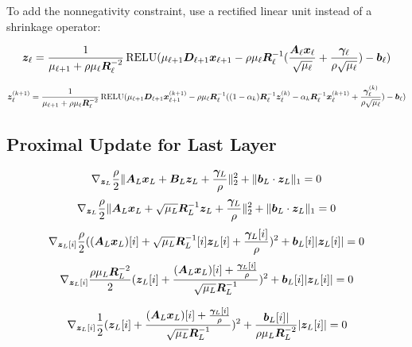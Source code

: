 To add the nonnegativity constraint, use a rectified linear unit instead of a shrinkage operator:

\begin{equation}
\bm{z}_{\ell} = \frac{1}{\mu_{\ell + 1} + \rho\mu_{\ell}\bm{R}_{\ell}^{-2}}\operatorname{RELU}(\mu_{\ell + 1}\bm{D}_{\ell + 1}\bm{x}_{\ell + 1} - \rho\mu_{\ell}\bm{R}_{\ell}^{-1}(\frac{\bm{A}_{\ell}\bm{x}_{\ell}}{\sqrt{\mu_{\ell}}} + \frac{\bm{\gamma}_{\ell}}{\rho\sqrt{\mu_{\ell}}}) - \bm{b}_{\ell})
\end{equation}

\begin{equation}
\bm{z}_{\ell}^{(k + 1)} = \frac{1}{\mu_{\ell + 1} + \rho\mu_{\ell}\bm{R}_{\ell}^{-2}}\operatorname{RELU}(\mu_{\ell + 1}\bm{D}_{\ell + 1}\bm{x}_{\ell + 1}^{(k + 1)} - \rho\mu_{\ell}\bm{R}_{\ell}^{-1}((1 - \alpha_k)\bm{R}_{\ell}^{-1}\bm{z}_{\ell}^{(k)} - \alpha_k\bm{R}_{\ell}^{-1}\bm{x}_{\ell}^{(k + 1)} + \frac{\bm{\gamma}_{\ell}^{(k)}}{\rho\sqrt{\mu_{\ell}}}) - \bm{b}_{\ell})
\end{equation}

\subsection{Proximal Update for Last Layer}
\begin{equation}
\nabla_{\bm{z}_L} \frac{\rho}{2}\|\bm{A}_L\bm{x}_L + \bm{B}_L\bm{z}_L + \frac{\bm{\gamma}_L}{\rho}\|_2^2 + \|\bm{b}_L\cdot \bm{z}_L\|_1 = 0
\end{equation}
\begin{equation}
\nabla_{\bm{z}_L} \frac{\rho}{2}\|\bm{A}_L\bm{x}_L + \sqrt{\mu_L}\bm{R}_L^{-1}\bm{z}_L + \frac{\bm{\gamma}_L}{\rho}\|_2^2 + \|\bm{b}_L\cdot \bm{z}_L\|_1 = 0
\end{equation}
\begin{equation}
\nabla_{\bm{z}_L[i]} \frac{\rho}{2}((\bm{A}_L\bm{x}_L)[i] + \sqrt{\mu_L}\bm{R}_L^{-1}[i]\bm{z}_L[i] + \frac{\bm{\gamma}_L[i]}{\rho})^2 + \bm{b}_L[i]|\bm{z}_L[i]| = 0
\end{equation}
\begin{equation}
\nabla_{\bm{z}_L[i]} \frac{\rho\mu_L\bm{R}_L^{-2}}{2}(\bm{z}_L[i] + \frac{(\bm{A}_L\bm{x}_L)[i] + \frac{\bm{\gamma}_L[i]}{\rho}}{\sqrt{\mu_L}\bm{R}_L^{-1}})^2 + \bm{b}_L[i]|\bm{z}_L[i]| = 0
\end{equation}

\begin{equation}
\nabla_{\bm{z}_L[i]} \frac{1}{2}(\bm{z}_L[i] + \frac{(\bm{A}_L\bm{x}_L)[i] + \frac{\bm{\gamma}_L[i]}{\rho}}{\sqrt{\mu_L}\bm{R}_L^{-1}})^2 + \frac{\bm{b}_L[i]|}{\rho\mu_L\bm{R}_L^{-2}}|\bm{z}_L[i]| = 0
\end{equation}

